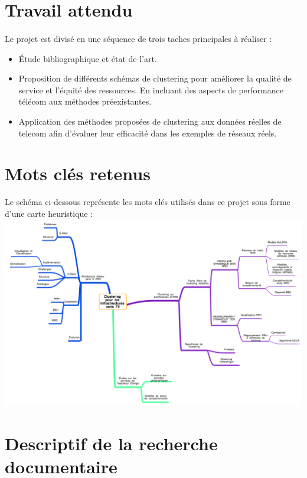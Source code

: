 \documentclass{article}
\begin{document}
\section{Travail attendu}
\paragraph{}
 Le projet est divisé en une séquence de trois taches principales à réaliser : \\
\begin{itemize}
    \item Étude bibliographique et état de l'art. 
    \item Proposition de différents schémas de clustering pour améliorer la qualité de service et l'équité des ressources. En incluant des aspects de performance télécom aux méthodes préexistantes.
    \item Application des méthodes proposées de clustering aux données réelles de telecom afin d'évaluer leur efficacité dans les exemples de réseaux réels.
\end{itemize}

\section{Mots clés retenus}
\begin{flushleft}
Le schéma ci-dessous représente les mots clés utilisés dans ce projet sous forme d'une carte heuristique :\\
\includegraphics[width=38em]{schema.png}\\[1.5cm]
\end{flushleft}
\section{Descriptif de la recherche documentaire}
\end{document}
